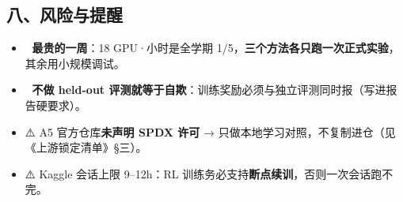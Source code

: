 \documentclass[
  chinese,
  11pt,
]{ctexart}
\providecommand{\tightlist}{%
  \setlength{\itemsep}{0pt}\setlength{\parskip}{0pt}}
\begin{document}
\subsection{八、风险与提醒}\label{ux516bux98ceux9669ux4e0eux63d0ux9192}

\begin{itemize}
\tightlist
\item
  🚨 \textbf{最贵的一周}：18 GPU·小时是全学期 1/5，\textbf{三个方法各只跑一次正式实验}，其余用小规模调试。
\item
  🚨 \textbf{不做 held-out 评测就等于自欺}：训练奖励必须与独立评测同时报（写进报告硬要求）。
\item
  ⚠️ A5 官方仓库\textbf{未声明 SPDX 许可} → 只做本地学习对照，不复制进仓（见《上游锁定清单》§三）。
\item
  ⚠️ Kaggle 会话上限 9--12h：RL 训练务必支持\textbf{断点续训}，否则一次会话跑不完。
\end{itemize}
\end{document}
